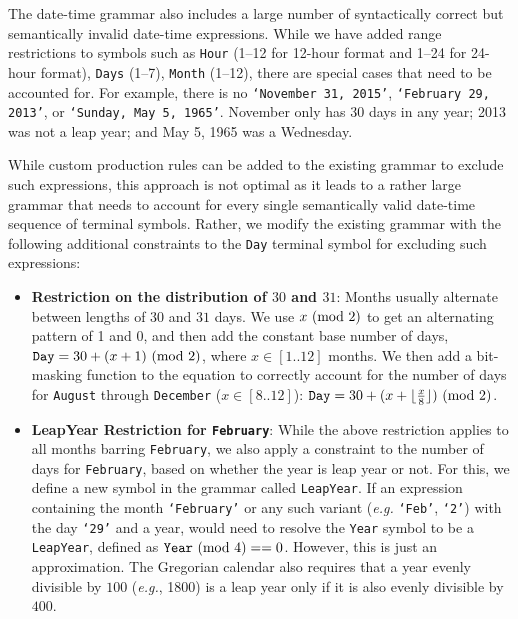 The date-time grammar also includes a large number of syntactically correct but semantically invalid date-time expressions. While we have added range restrictions to symbols such as \texttt{Hour} (1--12 for 12-hour format and 1--24 for 24-hour format), \texttt{Days} (1--7), \texttt{Month} (1--12), there are special cases that need to be accounted for. For example, there is no  \texttt{`November 31, 2015'}, \texttt{`February 29, 2013'}, or \texttt{`Sunday, May  5, 1965'}. November only has 30 days in any year; 2013 was not a leap year; and May 5, 1965 was a Wednesday.

While custom production rules can be added to the existing grammar to exclude such expressions, this approach is not optimal as it leads to a rather large grammar that needs to account for every single semantically valid date-time sequence of terminal symbols. Rather, we modify the existing grammar with the following additional constraints to the \texttt{Day} terminal symbol for excluding such expressions:

\begin{itemize}
\setlength\itemsep{0em}
\item \textbf{Restriction on the distribution of $30$ and $31$}:
Months usually alternate between lengths of $30$ and $31$ days. We use $x \ (\text{mod}\ 2)$ to get an alternating pattern of 1 and 0, and then add the constant base number of days, $\texttt{Day} = 30 + (x + 1) \ (\text{mod}\ 2)$, where $x \in [1..12]$ months. We then add a bit-masking function to the equation to correctly account for the number of days for \texttt{August} through \texttt{December} ($x \in [8..12]$): $\texttt{Day} = 30 + (x + \lfloor\frac{x}{8}\rfloor) \ (\text{mod}\ 2)$.


\item \textbf{LeapYear Restriction for \texttt{February}}:
While the above restriction applies to all months barring \texttt{February}, we also apply a constraint to the number of days for \texttt{February}, based on whether the year is leap year or not. For this, we define a new symbol in the grammar called \texttt{LeapYear}. If an expression containing the month \texttt{`February'} or any such variant (\textit{e.g.} \texttt{`Feb'}, \texttt{`2'}) with the day \texttt{`29'} and a year, would need to resolve the \texttt{Year} symbol to be a \texttt{LeapYear}, defined as $\texttt{Year} \ (\text{mod}\ 4) == 0$. However, this is just an approximation. The Gregorian calendar also requires that a year evenly divisible by $100$ (\textit{e.g.}, 1800) is a leap year only if it is also evenly divisible by $400$. 

\end{itemize}


